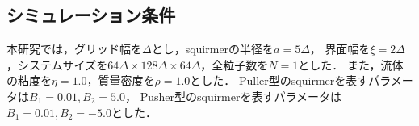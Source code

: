 \subsection{シミュレーション条件}
本研究では，グリッド幅を$\Delta$とし，squirmerの半径を$a = 5 \Delta$，
界面幅を$\xi = 2 \Delta$，システムサイズを$64 \Delta \times 128 \Delta \times 64 \Delta$，全粒子数を$N = 1$とした．
また，流体の粘度を$\eta = 1.0$，質量密度を$\rho = 1.0$とした．
Puller型のsquirmerを表すパラメータは$B_1 = 0.01, B_2 = 5.0$，
Pusher型のsquirmerを表すパラメータは$B_1 = 0.01, B_2 = -5.0$とした．
